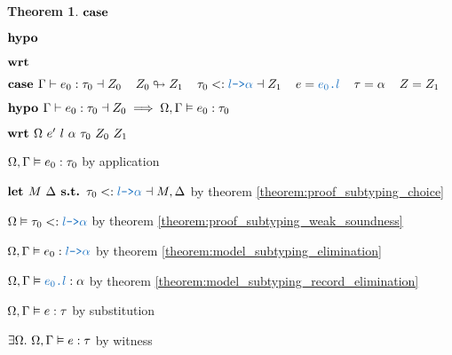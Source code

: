 \documentclass[acmsmall]{acmart}
\theoremstyle{definition}
\newtheorem{theorem}{Theorem}[section]
\begin{document}
\begin{theorem}
  \item \Z {} 
  \item \Z $\textbf{case } $ 
  \item \Z $\textbf{hypo } $ 
  \item \Z $\textbf{wrt } $ 



  \item \Z $\B{case } 
    \Gamma \entails e_0 \hastype \tau_0 \given Z_0
    \I
    Z_0 \looparrowright Z_1
    \I
    \tau_0 \subtypes \obj{$l$->$\alpha$} \given Z_1
    \I
    e = \obj{$e_0$.$l$} \I \tau = \alpha \I Z = Z_1
  $
   
  \item \Z $\textbf{hypo } 
    \Gamma \vdash e_0 : \tau_0 \dashv Z_0 
    \implies 
    \Omega, \Gamma \vDash e_0 : \tau_0
  $ 
  \item \Z $\textbf{wrt } \Omega\ e' \ l \ \alpha \ \tau_0 \ Z_0 \ Z_1$ 

    \item \Z\Z $
      \Omega, \Gamma \vDash e_0 : \tau_0
    $ by application

    \item \Z\Z $
      \B{let }
      M\ \Delta
      \B{ s.t. }
      \tau_0 \subtypes \obj{$l$->$\alpha$} \given M, \Delta
    $ by theorem \ref{theorem:proof_subtyping_choice}


    \item \Z\Z $
      \Omega \satisfies \tau_0  \subtypes \obj{$l$->$\alpha$}
    $ by theorem \ref{theorem:proof_subtyping_weak_soundness}
    \item \Z\Z $
      \Omega, \Gamma \satisfies e_0 \hastype \obj{$l$->$\alpha$}
    $ by theorem \ref{theorem:model_subtyping_elimination} 
    \item \Z\Z $
      \Omega, \Gamma \satisfies \obj{$e_0$.$l$} \hastype \alpha 
    $ by theorem \ref{theorem:model_subtyping_record_elimination} 
    \item \Z\Z $
      \Omega, \Gamma \vDash e : \tau
    $ by substitution 
    \item \Z\Z $
      \exists \Omega .\ \Omega, \Gamma \vDash e : \tau
    $ by witness 



\end{theorem}
\end{document}
